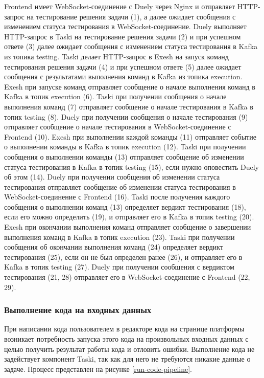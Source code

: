 Frontend имеет WebSocket-соединение с Duely через Nginx и отправляет HTTP-запрос на тестирование решения задачи (1),
а далее ожидает сообщения с изменением статуса тестирования в WebSocket-соединение.
Duely выполняет HTTP-запрос в Taski на тестирование решения задачи (2)
и при успешном ответе (3) далее ожидает сообщения с изменением статуса тестирования в Kafka из топика testing.
Taski делает HTTP-запрос в Exesh на запуск команд тестирования решения задачи (4)
и при успешном ответе (5) далее ожидает сообщения с результатами выполнения команд в Kafka из топика execution.
Exesh при запуске команд отправляет сообщение о начале выполнения команд в Kafka в топик execution (6).
Taski при получении сообщения о начале выполнения команд (7) отправляет сообщение о начале тестирования в Kafka в топик testing (8).
Duely при получении сообщения о начале тестирования (9) отправляет сообщение
о начале тестирования в WebSocket-соединение с Frontend (10).
Exesh при выполнении каждой команды (11) отправляет событие о выполнении команды в Kafka в топик execution (12).
Taski при получении сообщения о выполнении команды (13) отправляет сообщение
об изменении статуса тестирования в Kafka в топик testing (15), если нужно оповестить Duely об этом (14).
Duely при получении сообщения об изменении статуса тестирования отправляет сообщение
об изменении статуса тестирования в WebSocket-соединение с Frontend (16).
Taski после получения каждого сообщения о выполнении команд (13) определяет вердикт тестирования (18),
если его можно определить (19), и отправляет его в Kafka в топик testing (20).
Exesh при окончании выполнения команд отправляет сообщение о завершении выполнения команд в Kafka в топик execution (23).
Taski при получении сообщения об окончании выполнения команд (24) определяет вердикт тестирования (25),
если он не был определен ранее (26), и отправляет его в Kafka в топик testing (27).
Duely при получении сообщения с вердиктом тестирования (21, 28) отправляет его в WebSocket-соединение с Frontend (22, 29).

\subsubsection*{Выполнение кода на входных данных}

При написании кода пользователем в редакторе кода на странице платформы возникает потребность
запуска этого кода на произвольных входных данных с целью получить результат работы кода и отловить ошибки.
Выполнение кода не задействует компонент Taski, так как для него не требуются никакие данные о задаче.
Процесс представлен на рисунке \ref{run-code-pipeline}.

